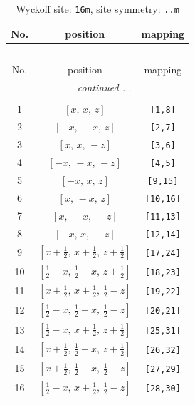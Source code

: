 \documentclass[fleqn,8pt]{jsarticle}
\begin{document}
\renewcommand{\arraystretch}{1.2}
\begin{longtable}{ccc}
\caption{Wyckoff site: {\tt 16m}, site symmetry: {\tt ..m}}
 \\
 \hline \hline
No. & position & mapping \\ \hline \endfirsthead

\multicolumn{2}{l}{\tablename\ \thetable{}} \\
 \hline \hline
No. & position & mapping \\ \hline \endhead

 \hline \hline
\multicolumn{2}{r}{\footnotesize\it continued ...} \\ \endfoot

 \hline \hline
\multicolumn{2}{r}{} \\ \endlastfoot

1 & $\left[ x,\, x,\, z \right]$ & {\tt [1,8]} \\ \hline
2 & $\left[ - x,\, - x,\, z \right]$ & {\tt [2,7]} \\ \hline
3 & $\left[ x,\, x,\, - z \right]$ & {\tt [3,6]} \\ \hline
4 & $\left[ - x,\, - x,\, - z \right]$ & {\tt [4,5]} \\ \hline
5 & $\left[ - x,\, x,\, z \right]$ & {\tt [9,15]} \\ \hline
6 & $\left[ x,\, - x,\, z \right]$ & {\tt [10,16]} \\ \hline
7 & $\left[ x,\, - x,\, - z \right]$ & {\tt [11,13]} \\ \hline
8 & $\left[ - x,\, x,\, - z \right]$ & {\tt [12,14]} \\ \hline
9 & $\left[ x + \frac{1}{2},\, x + \frac{1}{2},\, z + \frac{1}{2} \right]$ & {\tt [17,24]} \\ \hline
10 & $\left[ \frac{1}{2} - x,\, \frac{1}{2} - x,\, z + \frac{1}{2} \right]$ & {\tt [18,23]} \\ \hline
11 & $\left[ x + \frac{1}{2},\, x + \frac{1}{2},\, \frac{1}{2} - z \right]$ & {\tt [19,22]} \\ \hline
12 & $\left[ \frac{1}{2} - x,\, \frac{1}{2} - x,\, \frac{1}{2} - z \right]$ & {\tt [20,21]} \\ \hline
13 & $\left[ \frac{1}{2} - x,\, x + \frac{1}{2},\, z + \frac{1}{2} \right]$ & {\tt [25,31]} \\ \hline
14 & $\left[ x + \frac{1}{2},\, \frac{1}{2} - x,\, z + \frac{1}{2} \right]$ & {\tt [26,32]} \\ \hline
15 & $\left[ x + \frac{1}{2},\, \frac{1}{2} - x,\, \frac{1}{2} - z \right]$ & {\tt [27,29]} \\ \hline
16 & $\left[ \frac{1}{2} - x,\, x + \frac{1}{2},\, \frac{1}{2} - z \right]$ & {\tt [28,30]} \\
\end{longtable}
\end{document}
